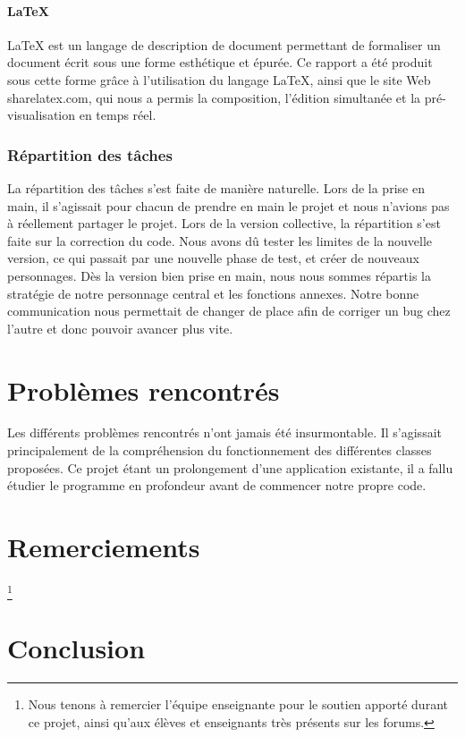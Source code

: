 \documentclass{article}
\begin{document}
\subsection{LaTeX}
LaTeX est un langage de description de document permettant de formaliser un document écrit sous une forme esthétique et épurée.
Ce rapport a été produit sous cette forme grâce à l'utilisation du langage LaTeX, ainsi que le site Web sharelatex.com, qui nous a permis la composition, l'édition simultanée et la pré-visualisation en temps réel.

\section{Répartition des tâches}
La répartition des tâches s'est faite de manière naturelle. Lors de la prise en main, il s'agissait pour chacun de prendre en main le projet et nous n'avions pas à réellement partager le projet.
Lors de la version collective, la répartition s'est faite sur la correction du code. Nous avons dû tester les limites de la nouvelle version, ce qui passait par une nouvelle phase de test, et créer de nouveaux personnages. Dès la version bien prise en main, nous nous sommes répartis la stratégie de notre personnage central et les fonctions annexes. Notre bonne communication nous permettait de changer de place afin de corriger un bug chez l'autre et donc pouvoir avancer plus vite.

\part{Problèmes rencontrés}
Les différents problèmes rencontrés n'ont jamais été insurmontable. Il s'agissait principalement de la compréhension du fonctionnement des différentes classes proposées. Ce projet étant un prolongement d'une application existante, il a fallu étudier le programme en profondeur avant de commencer notre propre code.

\clearpage
\part{Remerciements}
\thanks{Nous tenons à remercier l'équipe enseignante pour le soutien apporté durant ce projet, ainsi qu'aux élèves et enseignants très présents sur les forums.}

\part{Conclusion}
\end{document}
